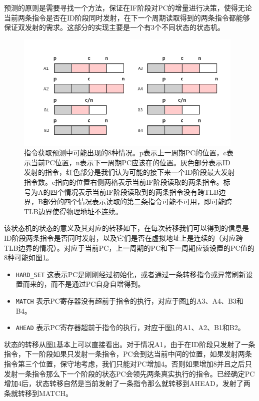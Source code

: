 预测的原则是需要寻找一个方法，保证在IF阶段对PC的增量进行决策，使得无论当前两条指令是否在ID阶段同时发射，在下一个周期读取得到的两条指令都能够保证双发射的需求。这部分的实现主要是一个有3个不同状态的状态机。

\begin{figure}[htbp]
	\centering
	\includegraphics[width=4.3in]{emit-prediction.png}
	\caption{指令获取预测中可能出现的8种情况。p表示上一周期PC的位置，c表示当前PC位置，n表示下一周期PC应该在的位置。灰色部分表示ID发射的指令，红色部分是我们认为可能的接下来一个ID阶段最大发射指令数。c指向的位置右侧两格表示当前IF阶段读取的两条指令。标号为A的四个情况表示当前IF阶段读取到的两条指令没有跨TLB边界，B部分的四个情况表示读取的第二条指令可能不可用，即可能跨TLB边界使得物理地址不连续。}
	\label{fig:emit-prediction}
\end{figure}

该状态机的状态的意义及其对应的转移如下，在每次转移我们可以得到的信息是ID阶段两条指令是否同时发射，以及它们是否在虚拟地址上是连续的（对应跨TLB边界的情况）。对应于当前PC，上一周期的PC和下一周期应该设置的PC值的8种可能如图\ref{fig:emit-prediction}。
\begin{itemize}
	\item \texttt{HARD\_SET} 这表示PC是刚刚经过初始化，或者通过一条转移指令或异常刷新设置而来的，而不是通过PC自身自增得到。
	\item \texttt{MATCH} 表示PC寄存器没有超前于指令的执行，对应于图\ref{fig:emit-prediction}的A3、A4、B3和B4。
	\item \texttt{AHEAD} 表示PC寄存器超前于指令的执行，对应于图\ref{fig:emit-prediction}的A1、A2、B1和B2。
\end{itemize}

状态的转移从图\ref{fig:emit-prediction}基本上可以直接看出。对于情况A1，由于在ID阶段只发射了一条指令，下一阶段如果只发射一条指令，PC会到达当前中间的位置，如果发射两条指令第三个位置，保守地考虑，我们只能对PC增加4。否则如果增加8并且之后只发射一条指令那么下一个阶段的状态PC会领先两条真实执行的指令。已经确定PC增加4后，状态转移自然是当前发射了一条指令那么就转移到AHEAD，发射了两条就转移到MATCH。

